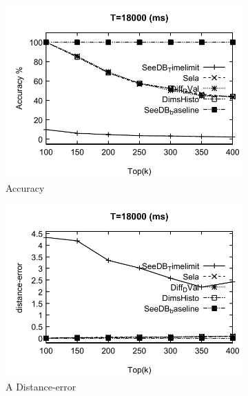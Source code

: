 \begin{figure}
  \begin{subfigure}[b]{0.32\textwidth}
    \includegraphics[width=\textwidth]{tl3.pdf}
    \caption{Accuracy }
       \label{fig:tlfig3}
  \end{subfigure}
	\begin{subfigure}[b]{0.32\textwidth}
    \includegraphics[width=\textwidth]{tl31.pdf}
    \caption{A Distance-error}
       \label{fig:tlfig31}
  \end{subfigure}
  \begin{subfigure}[b]{0.32\textwidth}

\end{subfigure}
\end{figure}

